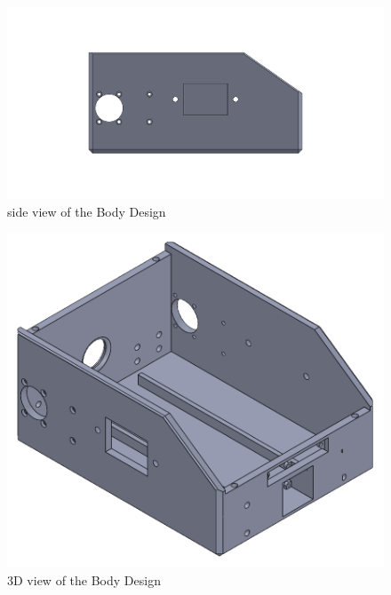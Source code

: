 \begin{figure}[h]
	\centering
	\includegraphics[width=1\linewidth]{Body_Design_2}
	\caption[Side view of the Body Design]{side view of the Body Design}
	\label{fig:bodydesign2}
\end{figure}
\begin{figure}[h]
	\centering
	\includegraphics[width=0.8\linewidth]{Body_Design_3}
	\caption[3D view of the Body Design]{3D view of the Body Design}
	\label{fig:bodydesign3}
\end{figure}







